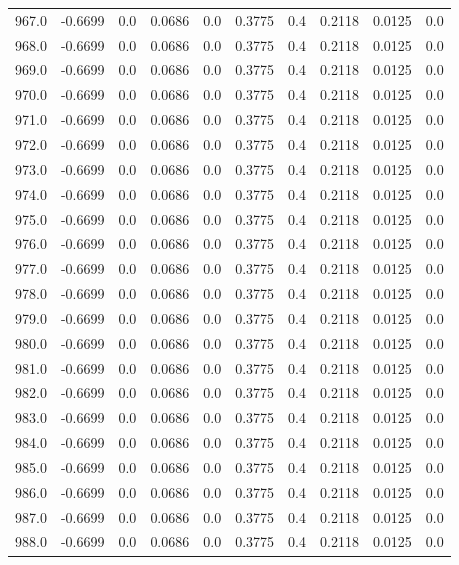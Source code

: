 \begin{longtable}{lrrrrrrrrr}
967.0 & -0.6699 & 0.0 & 0.0686 & 0.0 & 0.3775 & 0.4 & 0.2118 & 0.0125 & 0.0 \\
968.0 & -0.6699 & 0.0 & 0.0686 & 0.0 & 0.3775 & 0.4 & 0.2118 & 0.0125 & 0.0 \\
969.0 & -0.6699 & 0.0 & 0.0686 & 0.0 & 0.3775 & 0.4 & 0.2118 & 0.0125 & 0.0 \\
970.0 & -0.6699 & 0.0 & 0.0686 & 0.0 & 0.3775 & 0.4 & 0.2118 & 0.0125 & 0.0 \\
971.0 & -0.6699 & 0.0 & 0.0686 & 0.0 & 0.3775 & 0.4 & 0.2118 & 0.0125 & 0.0 \\
972.0 & -0.6699 & 0.0 & 0.0686 & 0.0 & 0.3775 & 0.4 & 0.2118 & 0.0125 & 0.0 \\
973.0 & -0.6699 & 0.0 & 0.0686 & 0.0 & 0.3775 & 0.4 & 0.2118 & 0.0125 & 0.0 \\
974.0 & -0.6699 & 0.0 & 0.0686 & 0.0 & 0.3775 & 0.4 & 0.2118 & 0.0125 & 0.0 \\
975.0 & -0.6699 & 0.0 & 0.0686 & 0.0 & 0.3775 & 0.4 & 0.2118 & 0.0125 & 0.0 \\
976.0 & -0.6699 & 0.0 & 0.0686 & 0.0 & 0.3775 & 0.4 & 0.2118 & 0.0125 & 0.0 \\
977.0 & -0.6699 & 0.0 & 0.0686 & 0.0 & 0.3775 & 0.4 & 0.2118 & 0.0125 & 0.0 \\
978.0 & -0.6699 & 0.0 & 0.0686 & 0.0 & 0.3775 & 0.4 & 0.2118 & 0.0125 & 0.0 \\
979.0 & -0.6699 & 0.0 & 0.0686 & 0.0 & 0.3775 & 0.4 & 0.2118 & 0.0125 & 0.0 \\
980.0 & -0.6699 & 0.0 & 0.0686 & 0.0 & 0.3775 & 0.4 & 0.2118 & 0.0125 & 0.0 \\
981.0 & -0.6699 & 0.0 & 0.0686 & 0.0 & 0.3775 & 0.4 & 0.2118 & 0.0125 & 0.0 \\
982.0 & -0.6699 & 0.0 & 0.0686 & 0.0 & 0.3775 & 0.4 & 0.2118 & 0.0125 & 0.0 \\
983.0 & -0.6699 & 0.0 & 0.0686 & 0.0 & 0.3775 & 0.4 & 0.2118 & 0.0125 & 0.0 \\
984.0 & -0.6699 & 0.0 & 0.0686 & 0.0 & 0.3775 & 0.4 & 0.2118 & 0.0125 & 0.0 \\
985.0 & -0.6699 & 0.0 & 0.0686 & 0.0 & 0.3775 & 0.4 & 0.2118 & 0.0125 & 0.0 \\
986.0 & -0.6699 & 0.0 & 0.0686 & 0.0 & 0.3775 & 0.4 & 0.2118 & 0.0125 & 0.0 \\
987.0 & -0.6699 & 0.0 & 0.0686 & 0.0 & 0.3775 & 0.4 & 0.2118 & 0.0125 & 0.0 \\
988.0 & -0.6699 & 0.0 & 0.0686 & 0.0 & 0.3775 & 0.4 & 0.2118 & 0.0125 & 0.0 \\

\end{longtable}
